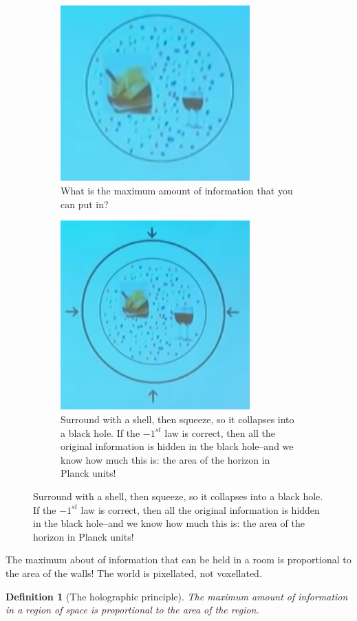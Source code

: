 \documentclass[]{article}
\newtheorem{defn}[thm]{Definition}
\begin{document}
\begin{figure}[H]
	\begin{center}
		\caption[Put some information in a box]{Put some information in a box. It could be alphabet soup, wine, cheese,...}
		\begin{subfigure}[t]{0.45\textwidth}
			\caption{	What is the maximum amount of information that you can put in?}
			\includegraphics[width=0.8\textwidth]{wh-information-in-box}
		\end{subfigure}
		\begin{subfigure}[t]{0.45\textwidth}
			\caption{Surround with a shell, then squeeze, so it collapses into a black hole. If the $-1^{st}$ law is correct, then all the original information is hidden in the black hole--and we know how much this is: the area of the horizon in Planck units!}
			\includegraphics[width=0.8\textwidth]{wh-surround-region}
		\end{subfigure}
	\end{center}
\end{figure}
The maximum about of information that can be held in a room is proportional to the area of the walls! The world is pixellated, not voxellated.
\begin{defn}[The holographic principle]
	The maximum amount of information in a region of space is proportional to the area of the region.
\end{defn}
\end{document}
